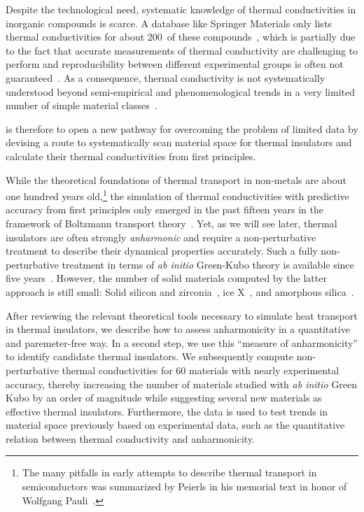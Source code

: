 Despite the technological need, systematic knowledge of thermal conductivities in inorganic compounds is scarce. A database like Springer Materials only lists thermal conductivities for about 200~of these compounds~\cite{SpringerMaterials}, which is partially due to the fact that accurate measurements of thermal conductivity are challenging to perform and reproducibility between different experimental groups is often not guaranteed~\cite{Wei.2016}. As a consequence, thermal conductivity is not systematically understood beyond semi-empirical and phenomenological trends in a very limited number of simple material classes~\cite{morelLi.2006}.

 is therefore to open a new pathway for overcoming the problem of limited data by devising a route to systematically scan material space for thermal insulators and calculate their thermal conductivities from first principles. 

While the theoretical foundations of thermal transport in non-metals are about one hundred years old,\footnote{The many pitfalls in early attempts to describe thermal transport in semiconductors was summarized by Peierls in his memorial text in honor of Wolfgang Pauli~\cite{Peierls1960}.} the simulation of thermal conductivities with predictive accuracy from first principles only emerged in the past fifteen years in the framework of Boltzmann transport theory~\cite{Broido.2007}. Yet, as we will see later, thermal insulators are often strongly \emph{anharmonic} and require a non-perturbative treatment to describe their dynamical properties accurately. Such a fully non-perturbative treatment in terms of \emph{ab initio} Green-Kubo theory is available since five years~\cite{Marcolongo.2016,Carbogno.2016}. However, the number of solid materials computed by the latter approach is still small: Solid silicon and zirconia~\cite{Carbogno.2016}, ice X~\cite{Grasselli.2020}, and amorphous silica~\cite{Marcolongo.2020}. 

 After reviewing the relevant theoretical tools necessary to simulate heat transport in thermal insulators, we describe how to assess anharmonicity in a quantitative and paremeter-free way. In a second step, we use this ``measure of anharmonicity'' to identify candidate thermal insulators. We subsequently compute non-perturbative thermal conductivities for 60 materials with nearly experimental accuracy, thereby increasing the number of materials studied with \emph{ab initio} Green Kubo by an order of magnitude while suggesting several new materials as effective thermal insulators. Furthermore, the data is used to test trends in material space previously based on experimental data, such as the quantitative relation between thermal conductivity and anharmonicity.


